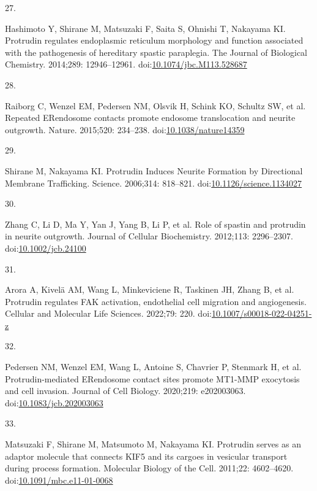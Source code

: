 \documentclass[
  12pt,
  a4paper,
]{book}
\newlength{\cslhangindent}
\newlength{\csllabelwidth}
\newlength{\cslentryspacingunit} %
\newenvironment{CSLReferences}[2] %
 {%
  \setlength{\parindent}{0pt}
  \ifodd #1
  \let\oldpar\par
  \def\par{\hangindent=\cslhangindent\oldpar}
  \fi
  \setlength{\parskip}{#2\cslentryspacingunit}
 }%
 {}
\newcommand{\CSLLeftMargin}[1]{\parbox[t]{\csllabelwidth}{#1}}
\newcommand{\CSLRightInline}[1]{\parbox[t]{\linewidth - \csllabelwidth}{#1}\break}
\begin{document}
\begin{CSLReferences}{0}{0}
\leavevmode{}%
\CSLLeftMargin{27. }%
\CSLRightInline{Hashimoto Y, Shirane M, Matsuzaki F, Saita S, Ohnishi T, Nakayama KI. Protrudin regulates endoplasmic reticulum morphology and function associated with the pathogenesis of hereditary spastic paraplegia. The Journal of Biological Chemistry. 2014;289: 12946--12961. doi:\href{https://doi.org/10.1074/jbc.M113.528687}{10.1074/jbc.M113.528687}}

\leavevmode{}%
\CSLLeftMargin{28. }%
\CSLRightInline{Raiborg C, Wenzel EM, Pedersen NM, Olsvik H, Schink KO, Schultz SW, et al. Repeated {ER}\textendash endosome contacts promote endosome translocation and neurite outgrowth. Nature. 2015;520: 234--238. doi:\href{https://doi.org/10.1038/nature14359}{10.1038/nature14359}}

\leavevmode{}%
\CSLLeftMargin{29. }%
\CSLRightInline{Shirane M, Nakayama KI. Protrudin {Induces Neurite Formation} by {Directional Membrane Trafficking}. Science. 2006;314: 818--821. doi:\href{https://doi.org/10.1126/science.1134027}{10.1126/science.1134027}}

\leavevmode{}%
\CSLLeftMargin{30. }%
\CSLRightInline{Zhang C, Li D, Ma Y, Yan J, Yang B, Li P, et al. Role of spastin and protrudin in neurite outgrowth. Journal of Cellular Biochemistry. 2012;113: 2296--2307. doi:\href{https://doi.org/10.1002/jcb.24100}{10.1002/jcb.24100}}

\leavevmode{}%
\CSLLeftMargin{31. }%
\CSLRightInline{Arora A, Kivelä AM, Wang L, Minkeviciene R, Taskinen JH, Zhang B, et al. Protrudin regulates {FAK} activation, endothelial cell migration and angiogenesis. Cellular and Molecular Life Sciences. 2022;79: 220. doi:\href{https://doi.org/10.1007/s00018-022-04251-z}{10.1007/s00018-022-04251-z}}

\leavevmode{}%
\CSLLeftMargin{32. }%
\CSLRightInline{Pedersen NM, Wenzel EM, Wang L, Antoine S, Chavrier P, Stenmark H, et al. Protrudin-mediated {ER}\textendash endosome contact sites promote {MT1-MMP} exocytosis and cell invasion. Journal of Cell Biology. 2020;219: e202003063. doi:\href{https://doi.org/10.1083/jcb.202003063}{10.1083/jcb.202003063}}

\leavevmode{}%
\CSLLeftMargin{33. }%
\CSLRightInline{Matsuzaki F, Shirane M, Matsumoto M, Nakayama KI. Protrudin serves as an adaptor molecule that connects {KIF5} and its cargoes in vesicular transport during process formation. Molecular Biology of the Cell. 2011;22: 4602--4620. doi:\href{https://doi.org/10.1091/mbc.e11-01-0068}{10.1091/mbc.e11-01-0068}}


\end{CSLReferences}
\end{document}

